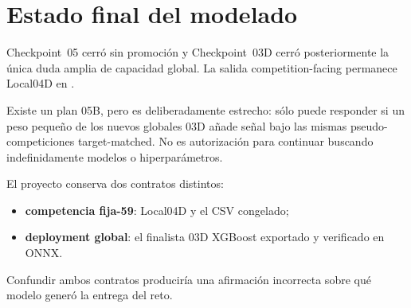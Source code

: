 \section{Estado final del modelado}

Checkpoint~05 cerró sin promoción y Checkpoint~03D cerró posteriormente la única duda amplia
de capacidad global. La salida competition-facing permanece Local04D en
.

Existe un plan 05B, pero es deliberadamente estrecho: sólo puede responder si un peso pequeño
de los nuevos globales 03D añade señal bajo las mismas pseudo-competiciones target-matched.
No es autorización para continuar buscando indefinidamente modelos o hiperparámetros.

El proyecto conserva dos contratos distintos:
\begin{itemize}
\item \textbf{competencia fija-59}: Local04D y el CSV congelado;
\item \textbf{deployment global}: el finalista 03D XGBoost exportado y verificado en ONNX.
\end{itemize}
Confundir ambos contratos produciría una afirmación incorrecta sobre qué modelo generó la
entrega del reto.
